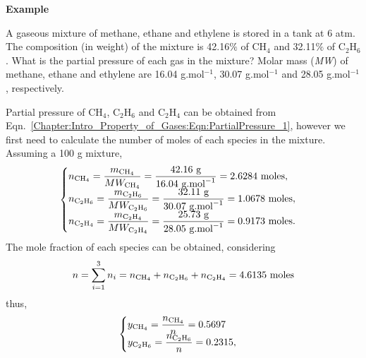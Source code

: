 \medskip
   \begin{MyExample}{\begin{center}{\bf Example}\end{center}}
     \begin{example}\label{Chapter:Intro_Property_of_Gases:Example4}
       A gaseous mixture of methane, ethane and ethylene is stored in a tank at 6 atm. The composition (in weight) of the mixture is 42.16$\%$ of CH$_{4}$ and 32.11$\%$ of C$_{2}$H$_{6}$. What is the partial pressure of each gas in the mixture? Molar mass ({\it MW}) of methane, ethane and ethylene are 16.04 g.mol$^{-1}$, 30.07 g.mol$^{-1}$ and 28.05 g.mol$^{-1}$, respectively.
     \end{example}

        Partial pressure of CH$_{4}$, C$_{2}$H$_{6}$ and C$_{2}$H$_{4}$ can be obtained from Eqn.~\ref{Chapter:Intro_Property_of_Gases:Eqn:PartialPressure_1}, however we first need to calculate the number of moles of each species in the mixture. Assuming a 100 g mixture,
       \begin{displaymath}
         \begin{cases}
           n_{\text{CH}_{4}} = \frc{m_{\text{CH}_{4}}}{MW_{\text{CH}_{4}}} = \frc{42.16\text{ g}}{16.04\text{ g.mol}^{-1}}= 2.6284\text{ moles},  \\
           n_{\text{C}_{2}\text{H}_{6}} = \frc{m_{\text{C}_{2}\text{H}_{6}}}{MW_{\text{C}_{2}\text{H}_{6}}} = \frc{32.11\text{ g}}{30.07\text{ g.mol}^{-1}}= 1.0678\text{ moles},  \\
           n_{\text{C}_{2}\text{H}_{4}} = \frc{m_{\text{C}_{2}\text{H}_{4}}}{MW_{\text{C}_{2}\text{H}_{4}}} = \frc{25.73\text{ g}}{28.05\text{ g.mol}^{-1}}= 0.9173\text{ moles}. 
         \end{cases}
       \end{displaymath}
       The mole fraction of each species can be obtained, considering
       \begin{displaymath}
         n = \summation[n_{i}]{i=1}{3} = n_{\text{CH}_{4}}+n_{\text{C}_{2}\text{H}_{6}}+n_{\text{C}_{2}\text{H}_{4}} = 4.6135\text{ moles}
       \end{displaymath}
       thus,
       \begin{displaymath}
         \begin{cases}
           y_{\text{CH}_{4}} = \frc{n_{\text{CH}_{4}}}{n} = 0.5697  \\
           y_{\text{C}_{2}\text{H}_{6}} = \frc{n_{\text{C}_{2}\text{H}_{6}}}{n} = 0.2315,  \\

\end{cases}
\end{displaymath}
\end{MyExample}
